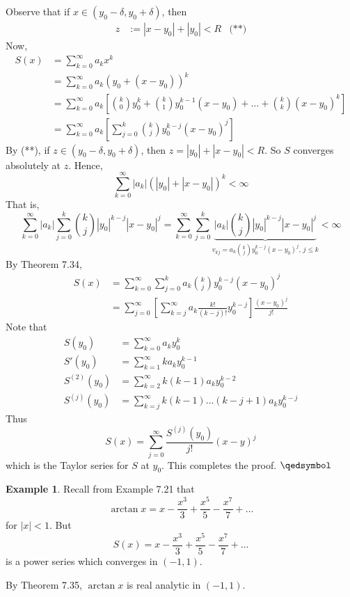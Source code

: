 \documentclass[11pt]{article}
\theoremstyle{definition}
\newtheorem{exmp}[thm]{Example}
\begin{document}
Observe that if $x \in (y_0 - \delta, y_0 + \delta)$, then
\begin{align*} z & := |x - y_0| + |y_0| < R & \text{(**)} \end{align*}
Now,
\begin{align*}
S(x) & = \sum_{k=0}^\infty a_k x^k \\
& = \sum_{k=0}^\infty a_k \left(y_0 + (x - y_0)\right)^k \\
& = \sum_{k=0}^\infty a_k \left[ \binom{k}{0} y_0^k + \binom{k}{1} y_0^{k-1} (x - y_0) + \dots + \binom{k}{k} (x - y_0)^k \right] \\
& = \sum_{k=0}^\infty a_k \left[ \sum_{j=0}^k \binom{k}{j} y_0^{k-j} (x - y_0)^j \right]
\end{align*}
By (**), if $z \in (y_0 - \delta, y_0 + \delta)$, then $z = |y_0| + |x - y_0| < R$. So $S$ converges absolutely at $z$. Hence,
$$\sum_{k=0}^\infty |a_k| \left(|y_0| + |x - y_0|\right)^k < \infty$$
That is,
$$\sum_{k=0}^\infty |a_k| \sum_{j=0}^k \binom{k}{j} |y_0|^{k-j} |x - y_0|^j = \sum_{k=0}^\infty \sum_{j=0}^k \underbrace{|a_k| \binom{k}{j} |y_0|^{k-j} |x - y_0|^j}_{v_{kj} = a_k \binom{k}{j} y_0^{k-j} (x - y_0)^j, \, j \leq k} < \infty$$
By Theorem 7.34,
\begin{align*}
S(x) & = \sum_{k=0}^\infty \sum_{j=0}^k a_k \binom{k}{j} y_0^{k-j} (x - y_0)^j \\
& = \sum_{j=0}^\infty \left[ \sum_{k=j}^\infty a_k \frac{k!}{(k-j)!} y_0^{k-j} \right] \frac{(x - y_0)^j}{j!}
\end{align*}
Note that
\begin{align*}
S(y_0) & = \sum_{k=0}^\infty a_k y_0^k \\
S'(y_0) & = \sum_{k=1}^\infty ka_k y_0^{k-1} \\
S^{(2)}(y_0) & = \sum_{k=2}^\infty k(k-1) a_k y_0^{k-2} \\
S^{(j)}(y_0) & = \sum_{k=j}^\infty k(k-1)\dots(k-j+1) a_k y_0^{k-j}
\end{align*}
Thus
$$S(x) = \sum_{j=0}^\infty \frac{S^{(j)}(y_0)}{j!} (x - y)^j$$
which is the Taylor series for $S$ at $y_0$. This completes the proof. $\qedsymbol$

\begin{exmp}
Recall from Example 7.21 that
$$\arctan x = x - \frac{x^3}3 + \frac{x^5}5 - \frac{x^7}7 + \dots$$
for $|x| < 1$. But
$$S(x) = x - \frac{x^3}3 + \frac{x^5}5 - \frac{x^7}7 + \dots$$
is a power series which converges in $(-1, 1)$.

By Theorem 7.35, $\arctan x$ is real analytic in $(-1, 1)$.
\end{exmp}
\end{document}
